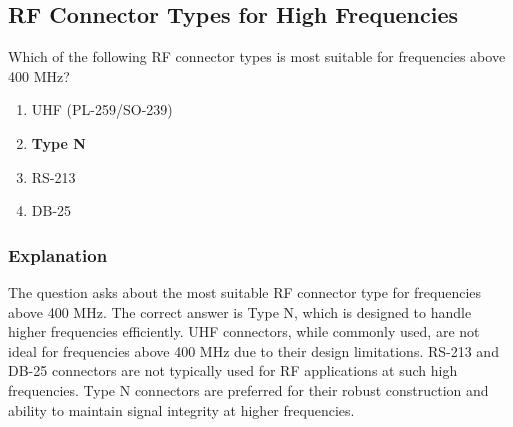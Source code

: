 \subsection{RF Connector Types for High Frequencies}
\label{T9B06}

\begin{tcolorbox}[colback=gray!10!white,colframe=black!75!black,title=T9B06]
Which of the following RF connector types is most suitable for frequencies above 400 MHz?
\begin{enumerate}[noitemsep]
    \item UHF (PL-259/SO-239)
    \item \textbf{Type N}
    \item RS-213
    \item DB-25
\end{enumerate}
\end{tcolorbox}

\subsubsection*{Explanation}
The question asks about the most suitable RF connector type for frequencies above 400 MHz. The correct answer is Type N, which is designed to handle higher frequencies efficiently. UHF connectors, while commonly used, are not ideal for frequencies above 400 MHz due to their design limitations. RS-213 and DB-25 connectors are not typically used for RF applications at such high frequencies. Type N connectors are preferred for their robust construction and ability to maintain signal integrity at higher frequencies.